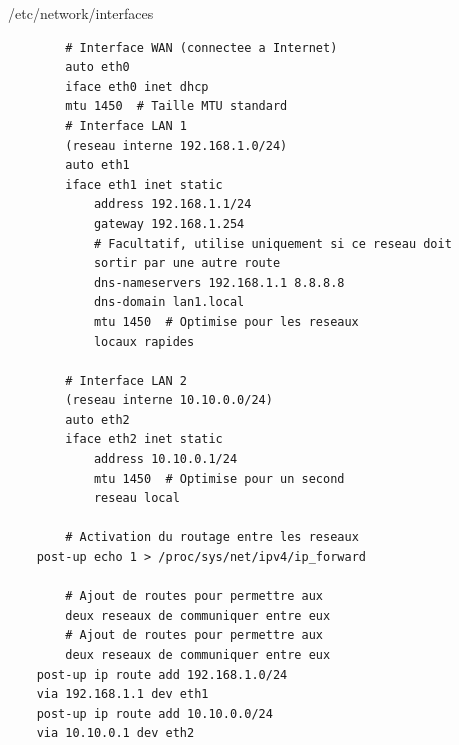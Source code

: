 \documentclass{article}
\begin{document}
\begin{configbox}{/etc/network/interfaces}
    \begin{lstlisting}
        # Interface WAN (connectee a Internet)
        auto eth0
        iface eth0 inet dhcp
        mtu 1450  # Taille MTU standard
        # Interface LAN 1 
        (reseau interne 192.168.1.0/24)
        auto eth1
        iface eth1 inet static
            address 192.168.1.1/24
            gateway 192.168.1.254  
            # Facultatif, utilise uniquement si ce reseau doit 
            sortir par une autre route
            dns-nameservers 192.168.1.1 8.8.8.8
            dns-domain lan1.local
            mtu 1450  # Optimise pour les reseaux 
            locaux rapides

        # Interface LAN 2 
        (reseau interne 10.10.0.0/24)
        auto eth2
        iface eth2 inet static
            address 10.10.0.1/24
            mtu 1450  # Optimise pour un second 
            reseau local

        # Activation du routage entre les reseaux
    post-up echo 1 > /proc/sys/net/ipv4/ip_forward

        # Ajout de routes pour permettre aux 
        deux reseaux de communiquer entre eux
        # Ajout de routes pour permettre aux 
        deux reseaux de communiquer entre eux
    post-up ip route add 192.168.1.0/24 
    via 192.168.1.1 dev eth1 
    post-up ip route add 10.10.0.0/24 
    via 10.10.0.1 dev eth2 
    \end{lstlisting}
\end{configbox}
\end{document}
